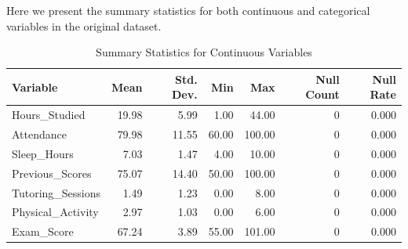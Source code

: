 \documentclass[10pt,letterpaper]{article}
\begin{document}
Here we present the summary statistics for both continuous and categorical variables in the original dataset. 
\begin{table}[htbp]
\centering
\caption{Summary Statistics for Continuous Variables}
\label{tab:continuous_summary}
\begin{tabular}{lrrrrrr}
\toprule
Variable & Mean & Std. Dev. & Min & Max & Null Count & Null Rate \\
\midrule
Hours\_Studied     & 19.98 & 5.99 & 1.00  & 44.00  & 0 & 0.000 \\
Attendance         & 79.98 & 11.55 & 60.00 & 100.00 & 0 & 0.000 \\
Sleep\_Hours       & 7.03  & 1.47 & 4.00  & 10.00  & 0 & 0.000 \\
Previous\_Scores   & 75.07 & 14.40 & 50.00 & 100.00 & 0 & 0.000 \\
Tutoring\_Sessions & 1.49  & 1.23 & 0.00  & 8.00   & 0 & 0.000 \\
Physical\_Activity & 2.97  & 1.03 & 0.00  & 6.00   & 0 & 0.000 \\
Exam\_Score        & 67.24 & 3.89 & 55.00 & 101.00 & 0 & 0.000 \\
\bottomrule
\end{tabular}
\end{table}
\end{document}
